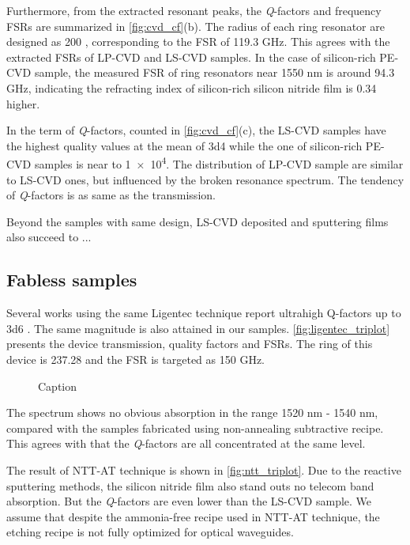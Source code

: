 Furthermore, from the extracted resonant peaks, the \textit{Q}-factors and frequency FSRs are summarized in \autoref{fig:cvd_cf}(b). The radius of each ring resonator are designed as 200 \um, corresponding to the FSR of 119.3 GHz. This agrees with the extracted FSRs of LP-CVD and LS-CVD samples. In the case of silicon-rich PE-CVD sample, the measured FSR of ring resonators near 1550 nm is around 94.3 GHz, indicating the refracting index of silicon-rich silicon nitride film is 0.34 higher.

In the term of \textit{Q}-factors, counted in \autoref{fig:cvd_cf}(c), the LS-CVD samples have the highest quality values at the mean of \num{3d4} while the one of silicon-rich PE-CVD samples is near to \num{1e4}. The distribution of LP-CVD sample are similar to LS-CVD ones, but influenced by the broken resonance spectrum. The tendency of \textit{Q}-factors is as same as the transmission.

\begin{figure}
	\centering
	
	\label{fig:cvd_cf}
\end{figure}


Beyond the samples with same design, LS-CVD deposited and sputtering films also succeed to 
...

\subsection{Fabless samples}

Several works using the same Ligentec technique report ultrahigh Q-factors up to \num{3d6} \cites{Yu2019, Vaidya2019}. The same magnitude is also attained in our samples. \autoref{fig:ligentec_triplot} presents the device transmission, quality factors and FSRs. The ring of this device is 237.28 \um and the FSR is targeted as 150 GHz.

\begin{figure}
    \centering
    
    \caption{Caption}
    \label{fig:ligentec_triplot}
\end{figure}

The spectrum shows no obvious absorption in the range 1520 nm - 1540 nm, compared with the samples fabricated using non-annealing subtractive recipe. This agrees with that the \textit{Q}-factors are all concentrated at the same level. 

The result of NTT-AT technique is shown in \autoref{fig:ntt_triplot}. Due to the reactive sputtering methods, the silicon nitride film also stand outs no telecom band absorption. But the \textit{Q}-factors are even lower than the LS-CVD sample. We assume that despite the ammonia-free recipe used in NTT-AT technique, the etching recipe is not fully optimized for optical waveguides. 

